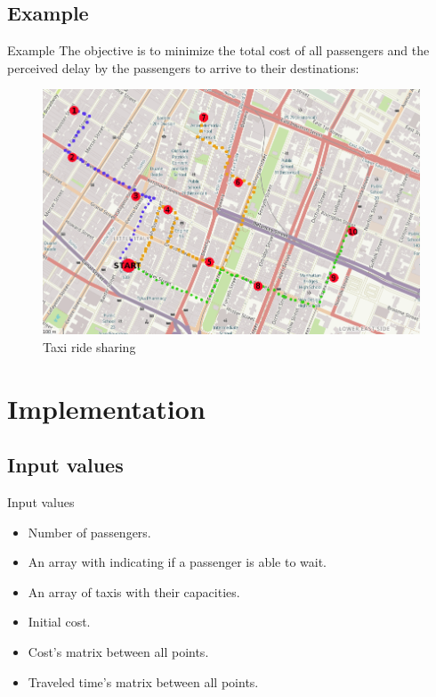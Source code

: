 \documentclass{beamer}
\begin{document}
\subsection{Example}
\begin{frame}{Example}{}
The objective is to minimize the total cost of all passengers and the perceived delay by the passengers to arrive to their destinations:
  \begin{figure}
      \centering
      \includegraphics[scale=0.36]{imgs/example.png}
      \caption{Taxi ride sharing}
      \label{fig:example}
  \end{figure}
\end{frame}

\section{Implementation} %

\subsection{Input values}
\begin{frame}{Input values}{}
\begin{itemize}
    \item Number of passengers.
    \item An array with indicating if a passenger is able to wait.
    \item An array of taxis with their capacities.
    \item Initial cost.
    \item Cost's matrix between all points.
    \item Traveled time's matrix between all points.
\end{itemize}
\end{frame}
\end{document}
